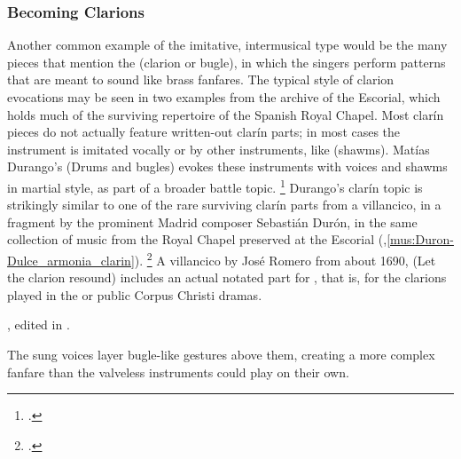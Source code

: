 \subsubsection{Becoming Clarions}

Another common example of the imitative, intermusical type would be the many
pieces that mention the  (clarion or bugle), in which the
singers perform patterns that are meant to sound like brass fanfares.
The typical style of clarion evocations may be seen in two examples from the
archive of the Escorial, which holds much of the surviving repertoire of the
Spanish Royal Chapel.
Most clarín pieces do not actually feature written-out clarín parts; in most
cases the instrument is imitated vocally or by other instruments, like
 (shawms).
Matías Durango's  (Drums and bugles) evokes these
instruments with voices and shawms in martial style, as part of a broader
battle topic.%
    \footnote{.}
Durango's clarín topic is strikingly similar to one of the rare surviving
clarín parts from a villancico, in a fragment by the prominent Madrid composer
Sebastián Durón, in the same collection of music from the Royal Chapel
preserved at the Escorial
(,\ref{mus:Duron-Dulce_armonia_clarin}).%
    \footnote{.}
A villancico by José Romero from about 1690,  (Let the
clarion resound) includes an actual notated part for , that is, for the clarions played in the 
or public Corpus Christi dramas.%
\begin{Footnote} 
    , edited in \autocite[655--661]{CaberoPueyo:PhD}.
\end{Footnote}
The sung voices layer bugle-like gestures above them, creating a more complex
fanfare than the valveless instruments could play on their own.


\begin{musicexample}
    \caption{Matías Durango,  (,
    Tiple I-1, estribillo): Imitation of  by voice and shawm}
    \label{mus:Durango-Cajas_clarines}
\end{musicexample}

